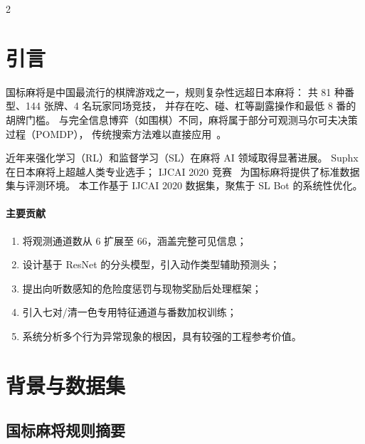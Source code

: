 \documentclass{article}
\begin{document}
\vspace{-4pt}
\begin{multicols}{2}

\section{引言}
\label{sec:intro}

国标麻将是中国最流行的棋牌游戏之一，规则复杂性远超日本麻将：
共 81 种番型、144 张牌、4 名玩家同场竞技，
并存在吃、碰、杠等副露操作和最低 8 番的胡牌门槛。
与完全信息博弈（如围棋）不同，麻将属于部分可观测马尔可夫决策过程（POMDP），
传统搜索方法难以直接应用~\cite{silver2016mastering}。

近年来强化学习（RL）和监督学习（SL）在麻将 AI 领域取得显著进展。
Suphx~\cite{li2020suphx} 在日本麻将上超越人类专业选手；
IJCAI 2020 竞赛~\cite{ijcai2020} 为国标麻将提供了标准数据集与评测环境。
本工作基于 IJCAI 2020 数据集，聚焦于 SL Bot 的系统性优化。

\paragraph{主要贡献}
\begin{enumerate}[leftmargin=*,topsep=2pt,itemsep=1pt,parsep=0pt]
  \item 将观测通道数从 6 扩展至 66，涵盖完整可见信息；
  \item 设计基于 ResNet 的分头模型，引入动作类型辅助预测头；
  \item 提出向听数感知的危险度惩罚与现物奖励后处理框架；
  \item 引入七对/清一色专用特征通道与番数加权训练；
  \item 系统分析多个行为异常现象的根因，具有较强的工程参考价值。
\end{enumerate}

\section{背景与数据集}
\label{sec:background}

\subsection{国标麻将规则摘要}


\end{multicols}
\end{document}
